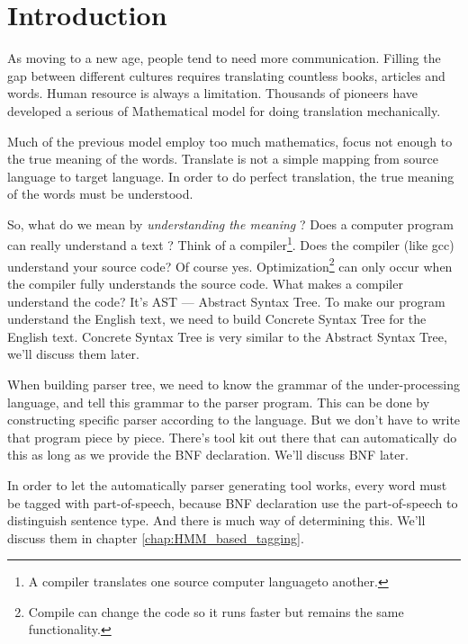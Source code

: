 \section{Introduction}

\noindent As moving to a new age, people tend to need more communication.
Filling the gap between different cultures requires translating countless books, articles and words.
Human resource is always a limitation.
Thousands of pioneers have developed a serious of Mathematical model for doing translation mechanically. 

Much of the previous model employ too much mathematics, focus not enough to the true meaning
of the words.
Translate is not a simple mapping from source language to target language.
In order to do perfect translation, the true meaning of the words must be understood. 

So, what do we mean by \emph{ understanding the meaning} ? 
Does a computer program can really understand a text ?
Think of a compiler\footnote{ A compiler translates one source computer language\footnotemark to another.}.
Does the compiler (like gcc) understand your source code?
Of course yes.
Optimization\footnote{ Compile can change the code so it runs faster but remains the same functionality. } can only occur when the compiler fully understands the source code.
What makes a compiler understand the code? It's AST --- Abstract Syntax Tree.
To make our program understand the English text, we need to build Concrete Syntax Tree for the English text.
Concrete Syntax Tree is very similar to the Abstract Syntax Tree, we'll discuss them later.

When building parser tree, we need to know the grammar of the under-processing language, and tell this grammar to the parser program.
This can be done by constructing specific parser according to the language.
But we don't have to write that program piece by piece.
There's tool kit out there that can automatically do this as long as we provide the BNF\cite{BNF} declaration. We'll discuss BNF later.

In order  to let the automatically parser generating tool works, every word must be tagged with part-of-speech, because BNF declaration use the part-of-speech to distinguish sentence type.
And there is much way of determining this. We'll discuss them in chapter \ref{chap:HMM_based_tagging}.




